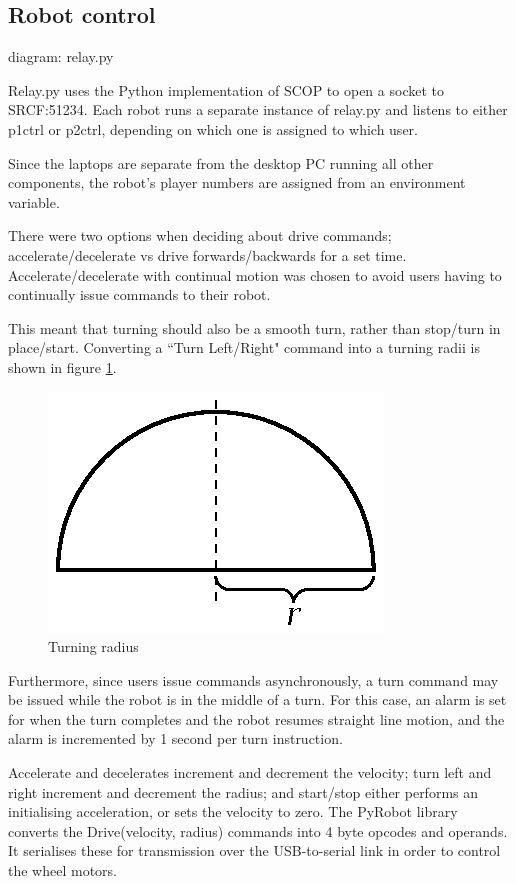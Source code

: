 \documentclass[12pt,a4,notitlepage]{report}
\renewcommand{\_}{\texttt{\symbol{95}}}
\newcommand{\<}{\texttt{\symbol{60}}}
\renewcommand{\>}{\texttt{\symbol{62}}}
\begin{document}
\subsection{Robot control}

{diagram: relay.py}

Relay.py uses the Python implementation of SCOP to open a socket to SRCF:51234. Each robot runs a separate instance of relay.py and listens to either p1ctrl or p2ctrl, depending on which one is assigned to which user. 

Since the laptops are separate from the desktop PC running all other components, the robot's player numbers are assigned from an environment variable.

There were two options when deciding about drive commands; accelerate/decelerate vs drive forwards/backwards for a set time. Accelerate/decelerate with continual motion was chosen to avoid users having to continually issue commands to their robot.

This meant that turning should also be a smooth turn, rather than stop/turn in place/start. Converting a ``Turn Left/Right" command into a turning radii is shown in figure \ref{tradius}.

\begin{figure}
\centering
\includegraphics[scale=1.0,angle=0]{diagrams/turningradius.ps}
\caption{Turning radius}
\label{tradius}
\end{figure}


Furthermore, since users issue commands asynchronously, a turn command may be issued while the robot is in the middle of a turn. For this case, an alarm is set for when the turn completes and the robot resumes straight line motion, and the alarm is incremented by 1 second per turn instruction. 

Accelerate and decelerates increment and decrement the velocity; turn left and right increment and decrement the radius; and start/stop either performs an initialising acceleration, or sets the velocity to zero. The PyRobot library converts the Drive(velocity, radius) commands into 4 byte opcodes and operands. It serialises these for transmission over the USB-to-serial link in order to control the wheel motors.
\end{document}
